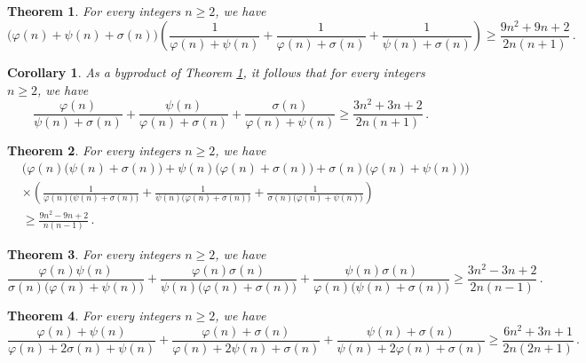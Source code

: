 \documentclass[12pt]{article}
\newtheorem{theorem}{Theorem}
\newtheorem{corollary}{Corollary}
\begin{document}
\begin{theorem}\label{Theorem2}
For every integers $n\geq2$, we have
\begin{equation}\label{lowerbound2}
\big(\varphi(n)+\psi(n)+\sigma(n)\big)\left(\frac{1}{\varphi(n)+\psi(n)}+\frac{1}{\varphi(n)+\sigma(n)}+\frac{1}{\psi(n)+\sigma(n)}\right)\geq\frac{9n^2+9n+2}{2n(n+1)}\,.
\end{equation}
\end{theorem}


\begin{corollary}
As a byproduct of Theorem \ref{Theorem2}, it follows that for every integers $n\geq2$, we have
\begin{equation*}
\frac{\varphi(n)}{\psi(n)+\sigma(n)}+\frac{\psi(n)}{\varphi(n)+\sigma(n)}+\frac{\sigma(n)}{\varphi(n)+\psi(n)}\geq\frac{3n^2+3n+2}{2n(n+1)}\,.
\end{equation*}
\end{corollary}


\begin{theorem}\label{Theorem3}
For every integers $n\geq2$, we have
\begin{align}\label{lowerbound3}
&\Big(\varphi(n)\big(\psi(n)+\sigma(n)\big)+\psi(n)\big(\varphi(n)+\sigma(n)\big)+\sigma(n)\big(\varphi(n)+\psi(n)\big)\Big)\nonumber\\
&\times\left(\frac{1}{\varphi(n)\big(\psi(n)+\sigma(n)\big)}+\frac{1}{\psi(n)\big(\varphi(n)+\sigma(n)\big)}+\frac{1}{\sigma(n)\big(\varphi(n)+\psi(n)\big)}\right)\nonumber\\
&\geq\frac{9n^2-9n+2}{n(n-1)}\,.
\end{align}
\end{theorem}


\begin{theorem}\label{Theorem4}
For every integers $n\geq2$, we have
\begin{equation}\label{lowerbound4}
\frac{\varphi(n)\psi(n)}{\sigma(n)\big(\varphi(n)+\psi(n)\big)}+\frac{\varphi(n)\sigma(n)}{\psi(n)\big(\varphi(n)+\sigma(n)\big)}+\frac{\psi(n)\sigma(n)}{\varphi(n)\big(\psi(n)+\sigma(n)\big)}\geq\frac{3n^2-3n+2}{2n(n-1)}\,.
\end{equation}
\end{theorem}


\begin{theorem}\label{Theorem5}
For every integers $n\geq2$, we have
\begin{equation}\label{lowerbound5}
\frac{\varphi(n)+\psi(n)}{\varphi(n)+2\sigma(n)+\psi(n)}+\frac{\varphi(n)+\sigma(n)}{\varphi(n)+2\psi(n)+\sigma(n)}+\frac{\psi(n)+\sigma(n)}{\psi(n)+2\varphi(n)+\sigma(n)}\geq\frac{6n^2+3n+1}{2n(2n+1)}\,.
\end{equation}
\end{theorem}
\end{document}
